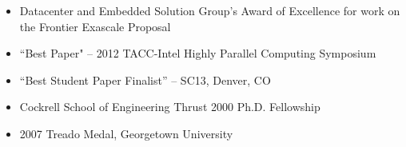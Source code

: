 \vspace{-0.3in}

\begin{itemize}
	\itemsep 0pt
	\item Datacenter and Embedded Solution Group’s Award of Excellence for work on the Frontier Exascale Proposal
	\item ``Best Paper" -- 2012 TACC-Intel Highly Parallel Computing
	      Symposium 
        \item ``Best Student Paper Finalist'' -- SC13, Denver, CO
        \item Cockrell School of Engineering Thrust 2000 Ph.D. Fellowship
        \item 2007 Treado Medal, Georgetown University      
\end{itemize}

